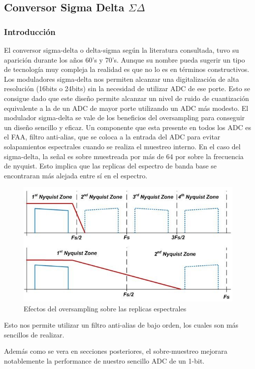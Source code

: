 %
%
%

\subsection{Conversor Sigma Delta $\Sigma \Delta$}

\subsubsection{Introducción}
El conversor sigma-delta o delta-sigma según la literatura consultada, tuvo su aparición durante los años 60's y 70's. Aunque su nombre pueda sugerir un tipo de tecnología muy compleja la realidad es que no lo es en términos constructivos. Los moduladores sigma-delta nos permiten alcanzar una digitalización de alta resolución (16bits o 24bits) sin la necesidad de utilizar ADC de ese porte. Esto se consigue dado que este diseño permite alcanzar un nivel de ruido de cuantización equivalente a la de un ADC de mayor porte utilizando un ADC más modesto.
El modulador sigma-delta se vale de los beneficios del oversampling para conseguir un diseño sencillo y eficaz.
Un componente que esta presente en todos los ADC es el FAA, filtro anti-alias, que se coloca a la entrada del ADC para evitar solapamientos espectrales cuando se realiza el muestreo interno. En el caso del sigma-delta,  la señal es sobre muestreada por más de 64 por sobre la frecuencia de nyquist. Esto implica que las replicas del espectro de banda base se encontraran más alejada entre sí en el espectro.
\begin{figure}[H]
	\centering
	\includegraphics[width=0.7\linewidth]{ImagenesEjercicio2/Oversampling}
	\caption{Efectos del oversampling sobre las replicas espectrales}
	\label{fig:oversampling}
\end{figure}
Esto nos permite utilizar un filtro anti-alias de bajo orden, los cuales son más sencillos de realizar.


Además como se vera en secciones posteriores, el sobre-muestreo mejorara notablemente la performance de nuestro sencillo ADC de un 1-bit.

